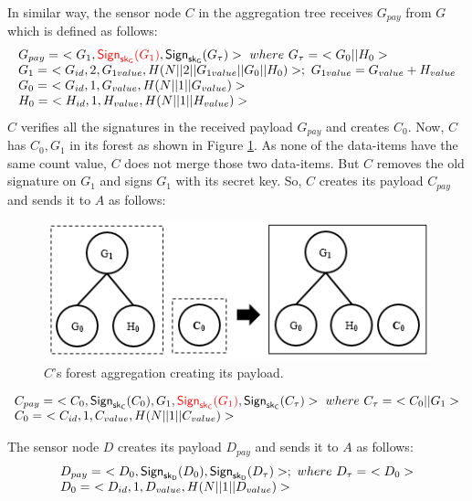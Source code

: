 		In similar way, the sensor node $C$ in the aggregation tree receives $G_{pay}$ from $G$ which is defined as follows:
		\begin{equation*}
			\begin{array}{l}
				G_{pay} =\ <G_{1},\textcolor{red}{\textsf{Sign}_{\sf{sk}_{G}}(G_{1})}, \textsf{Sign}_{\sf{sk}_{G}}(G_{\tau})>\ where\ G_{\tau} =\ <G_{0} || H_{0}>\\
				G_{1} =\ < G_{id}, 2, G_{1value}, H(N||2||G_{1value}||G_{0}||H_{0})>;\ G_{1value} = G_{value} + H_{value} \\
				G_{0} =\ <G_{id}, 1, G_{value}, H(N||1||G_{value})>\\
				H_{0} =\ <H_{id}, 1, H_{value}, H(N||1||H_{value})>
			\end{array}
		\end{equation*}
		$C$ verifies all the signatures in the received payload $G_{pay}$ and creates $C_{0}$.
		Now, $C$ has $C_{0},G_{1}$ in its forest as shown in Figure \ref{fig:c-forest-payload}. 
		As none of the data-items have the same count value, $C$ does not merge those two data-items.
		But $C$ removes the old signature on $G_{1}$ and signs $G_{1}$ with its secret key.
		So, $C$ creates its payload $C_{pay}$ and sends it to $A$ as follows:
		\begin{figure}[h!]
			\centering
			\includegraphics{images/c-forest-payload.png}
			\caption{$C$'s forest aggregation creating its payload.}
			\label{fig:c-forest-payload}
		\end{figure}
		\begin{equation*}
			\begin{array}{l}
				C_{pay} =\ <C_{0},\textsf{Sign}_{\sf{sk}_{C}}(C_{0}),G_{1},\textcolor{red}{\textsf{Sign}_{\sf{sk}_{C}}(G_{1})}, \textsf{Sign}_{\sf{sk}_{C}}(C_{\tau})>\ where\ C_{\tau} =\ <C_{0} || G_{1}>\\
				C_{0} =\ <C_{id}, 1, C_{value}, H(N||1||C_{value})>
			\end{array}
		\end{equation*}

		The sensor node $D$ creates its payload $D_{pay}$ and sends it to $A$ as follows:
		\begin{equation*}
			\begin{array}{l}
				D_{pay} =\ <D_{0}, \textsf{Sign}_{\sf{sk}_{D}}(D_{0}), \textsf{Sign}_{\sf{sk}_{D}}(D_{\tau})>;\ where\ D_{\tau} =\ <D_{0}>\\
				D_{0} =\ <D_{id},1,D_{value},H(N||1||D_{value})>
			\end{array}
		\end{equation*}

